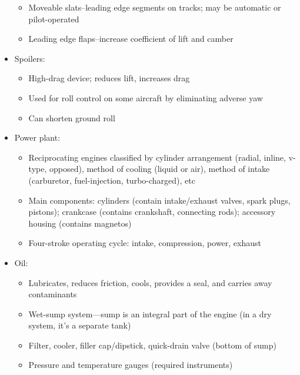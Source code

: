 \begin{itemize}
\begin{itemize}
      \item Moveable slats--leading edge segments on tracks; may be automatic or pilot-operated

      \item Leading edge flaps--increase coefficient of lift and camber
    \end{itemize}

  \item Spoilers:
    \begin{itemize}
      \item High-drag device; reduces lift, increases drag

      \item Used for roll control on some aircraft by eliminating adverse yaw

      \item Can shorten ground roll
    \end{itemize}

  \item Power plant:
    \begin{itemize}
        \item Reciprocating engines classified by cylinder arrangement (radial,
          inline, v-type, opposed), method of cooling (liquid or air), method
          of intake (carburetor, fuel-injection, turbo-charged), etc

        \item Main components: cylinders (contain intake/exhaust valves, spark
          plugs, pistons); crankcase (contains crankshaft, connecting rods);
          accessory housing (contains magnetos)

        \item Four-stroke operating cycle: intake, compression, power, exhaust
    \end{itemize}

  \item Oil:
    \begin{itemize}
      \item Lubricates, reduces friction, cools, provides a seal, and carries
        away contaminants

      \item Wet-sump system—sump is an integral part of the engine (in a dry
        system, it's a separate tank)

      \item Filter, cooler, filler cap/dipstick, quick-drain valve (bottom of
        sump)

      \item Pressure and temperature gauges (required instruments)
    \end{itemize}


\end{itemize}
